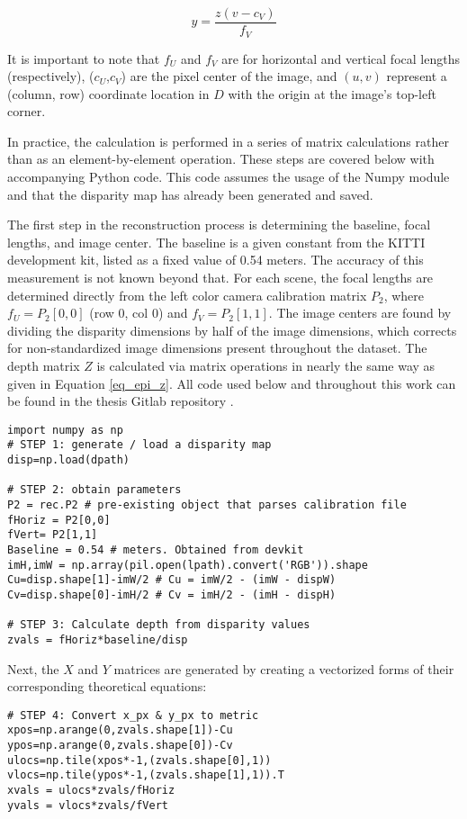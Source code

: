 \begin{equation}
y = \frac{z(v - c_V)}{f_V}
\end{equation}

It is important to note that $f_U$ and $f_V$ are for horizontal and vertical focal lengths (respectively), ($c_U$,$c_V$) are the pixel center of the image, and $(u,v)$ represent a (column, row) coordinate location in $D$ with the origin at the image's top-left corner.

In practice, the calculation is performed in a series of matrix calculations rather than as an element-by-element operation. These steps are covered below with accompanying Python code. This code assumes the usage of the Numpy module and that the disparity map has already been generated and saved.

The first step in the reconstruction process is determining the baseline, focal lengths, and image center. The baseline is a given constant from the KITTI development kit, listed as a fixed value of 0.54 meters. The accuracy of this measurement is not known beyond that. For each scene, the focal lengths are determined directly from the left color camera calibration matrix $P_2$, where $f_U=P_2[0,0]$ (row 0, col 0) and $f_V=P_2[1,1]$. The image centers are found by dividing the disparity dimensions by half of the image dimensions, which corrects for non-standardized image dimensions present throughout the dataset. The depth matrix $Z$ is calculated via matrix operations in nearly the same way as given in Equation \ref{eq_epi_z}. All code used below and throughout this work can be found in the thesis Gitlab repository \cite{gonzalez_smart3d_2019}. 

\begin{lstlisting}
import numpy as np
# STEP 1: generate / load a disparity map
disp=np.load(dpath)

# STEP 2: obtain parameters
P2 = rec.P2 # pre-existing object that parses calibration file
fHoriz = P2[0,0]
fVert= P2[1,1]
Baseline = 0.54 # meters. Obtained from devkit
imH,imW = np.array(pil.open(lpath).convert('RGB')).shape
Cu=disp.shape[1]-imW/2 # Cu = imW/2 - (imW - dispW)
Cv=disp.shape[0]-imH/2 # Cv = imH/2 - (imH - dispH)

# STEP 3: Calculate depth from disparity values
zvals = fHoriz*baseline/disp
\end{lstlisting}

Next, the $X$ and $Y$ matrices are generated by creating a vectorized forms of their corresponding theoretical equations: 
\begin{lstlisting}
# STEP 4: Convert x_px & y_px to metric
xpos=np.arange(0,zvals.shape[1])-Cu
ypos=np.arange(0,zvals.shape[0])-Cv
ulocs=np.tile(xpos*-1,(zvals.shape[0],1))
vlocs=np.tile(ypos*-1,(zvals.shape[1],1)).T
xvals = ulocs*zvals/fHoriz
yvals = vlocs*zvals/fVert
\end{lstlisting}

